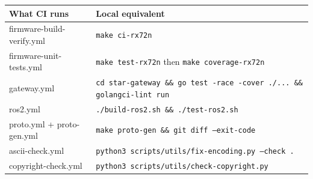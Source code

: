 \begin{center}
\begin{tabular}{|p{4.5cm}|p{9.5cm}|}
\hline
\textbf{What CI runs}                  & \textbf{Local equivalent}                                                                                                       \\
\hline
firmware-build-verify.yml              & \texttt{make ci-rx72n}                                                                                                          \\
firmware-unit-tests.yml                & \texttt{make test-rx72n} then \texttt{make coverage-rx72n}                                                                       \\
gateway.yml                            & \texttt{cd star-gateway \&\& go test -race -cover ./... \&\& golangci-lint run}                                                   \\
ros2.yml                               & \texttt{./build-ros2.sh \&\& ./test-ros2.sh}                                                                                       \\
proto.yml + proto-gen.yml              & \texttt{make proto-gen \&\& git diff --exit-code}                                                                                \\
ascii-check.yml                        & \texttt{python3 scripts/utils/fix-encoding.py --check .}                                                                          \\
copyright-check.yml                    & \texttt{python3 scripts/utils/check-copyright.py}                                                                                 \\
\hline
\end{tabular}
\end{center}
